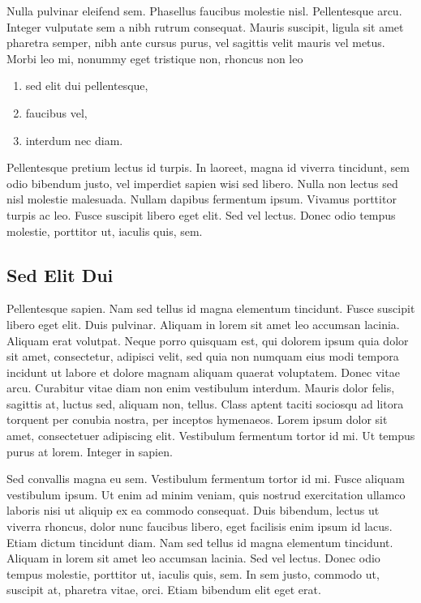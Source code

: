Nulla pulvinar eleifend sem. Phasellus faucibus molestie nisl. Pellentesque arcu. Integer vulputate sem a nibh rutrum consequat. Mauris suscipit, ligula sit amet pharetra semper, nibh ante cursus purus, vel sagittis velit mauris vel metus. Morbi leo mi, nonummy eget tristique non, rhoncus non leo
\begin{enumerate}
	\item sed elit dui pellentesque,
	\item faucibus vel,
	\item interdum nec diam.
\end{enumerate}
Pellentesque pretium lectus id turpis. In laoreet, magna id viverra tincidunt, sem odio bibendum justo, vel imperdiet sapien wisi sed libero. Nulla non lectus sed nisl molestie malesuada. Nullam dapibus fermentum ipsum. Vivamus porttitor turpis ac leo. Fusce suscipit libero eget elit. Sed vel lectus. Donec odio tempus molestie, porttitor ut, iaculis quis, sem.

\subsection{Sed Elit Dui}
Pellentesque sapien. Nam sed tellus id magna elementum tincidunt. Fusce suscipit libero eget elit. Duis pulvinar. Aliquam in lorem sit amet leo accumsan lacinia. Aliquam erat volutpat. Neque porro quisquam est, qui dolorem ipsum quia dolor sit amet, consectetur, adipisci velit, sed quia non numquam eius modi tempora incidunt ut labore et dolore magnam aliquam quaerat voluptatem. Donec vitae arcu. Curabitur vitae diam non enim vestibulum interdum. Mauris dolor felis, sagittis at, luctus sed, aliquam non, tellus. Class aptent taciti sociosqu ad litora torquent per conubia nostra, per inceptos hymenaeos. Lorem ipsum dolor sit amet, consectetuer adipiscing elit. Vestibulum fermentum tortor id mi. Ut tempus purus at lorem. Integer in sapien.

Sed convallis magna eu sem. Vestibulum fermentum tortor id mi. Fusce aliquam vestibulum ipsum. Ut enim ad minim veniam, quis nostrud exercitation ullamco laboris nisi ut aliquip ex ea commodo consequat. Duis bibendum, lectus ut viverra rhoncus, dolor nunc faucibus libero, eget facilisis enim ipsum id lacus. Etiam dictum tincidunt diam. Nam sed tellus id magna elementum tincidunt. Aliquam in lorem sit amet leo accumsan lacinia. Sed vel lectus. Donec odio tempus molestie, porttitor ut, iaculis quis, sem. In sem justo, commodo ut, suscipit at, pharetra vitae, orci. Etiam bibendum elit eget erat.

